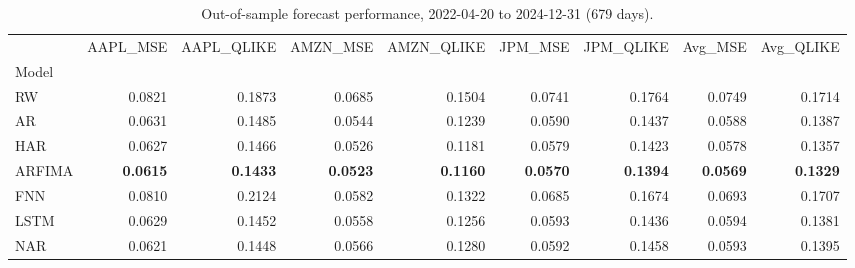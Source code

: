 \begin{table}
\caption{Out-of-sample forecast performance, 2022-04-20 to 2024-12-31 (679 days).}
\label{tab:final_results}
\begin{tabular}{lrrrrrrrr}
\toprule
 & AAPL_MSE & AAPL_QLIKE & AMZN_MSE & AMZN_QLIKE & JPM_MSE & JPM_QLIKE & Avg_MSE & Avg_QLIKE \\
Model &  &  &  &  &  &  &  &  \\
\midrule
RW & 0.0821 & 0.1873 & 0.0685 & 0.1504 & 0.0741 & 0.1764 & 0.0749 & 0.1714 \\
AR & 0.0631 & 0.1485 & 0.0544 & 0.1239 & 0.0590 & 0.1437 & 0.0588 & 0.1387 \\
HAR & 0.0627 & 0.1466 & 0.0526 & 0.1181 & 0.0579 & 0.1423 & 0.0578 & 0.1357 \\
ARFIMA & \textbf{0.0615} & \textbf{0.1433} & \textbf{0.0523} & \textbf{0.1160} & \textbf{0.0570} & \textbf{0.1394} & \textbf{0.0569} & \textbf{0.1329} \\
FNN & 0.0810 & 0.2124 & 0.0582 & 0.1322 & 0.0685 & 0.1674 & 0.0693 & 0.1707 \\
LSTM & 0.0629 & 0.1452 & 0.0558 & 0.1256 & 0.0593 & 0.1436 & 0.0594 & 0.1381 \\
NAR & 0.0621 & 0.1448 & 0.0566 & 0.1280 & 0.0592 & 0.1458 & 0.0593 & 0.1395 \\
\bottomrule
\end{tabular}
\end{table}
